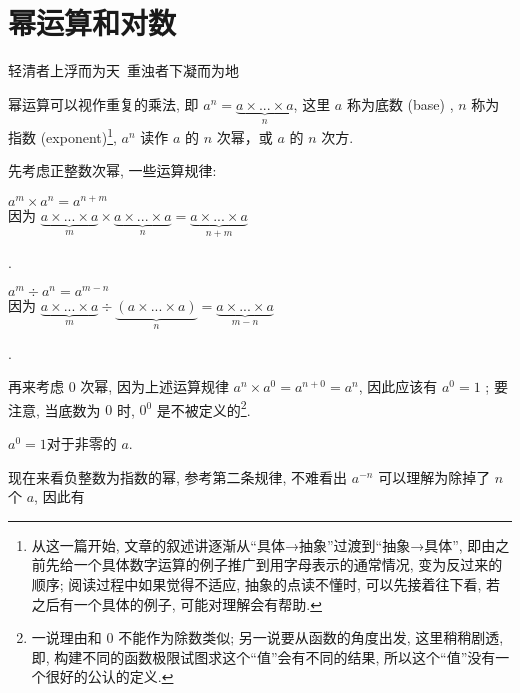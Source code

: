 \section{幂运算和对数}\label{002}

\begin{flushright}{\kaishu 轻清者上浮而为天\ 重浊者下凝而为地}\end{flushright}

\begin{tcolorbox}[size=fbox, breakable, enhanced jigsaw, title={幂运算
(exponentiation)}]

幂运算可以视作重复的乘法, 即
$a^n=\underbrace{a\times ...\times a}_{n}$, 这里 $a$ 称为底数 (base)
, $n$ 称为指数 (exponent)\footnote{从这一篇开始,
  文章的叙述讲逐渐从``具体→抽象''过渡到``抽象→具体'',
  即由之前先给一个具体数字运算的例子推广到用字母表示的通常情况,
  变为反过来的顺序; 阅读过程中如果觉得不适应, 抽象的点读不懂时,
  可以先接着往下看, 若之后有一个具体的例子, 可能对理解会有帮助.},
$a^n$ 读作 $a$ 的 $n$ 次幂，或 $a$ 的 $n$ 次方.

先考虑正整数次幂, 一些运算规律:

\begin{itemize}

{\item
$\boxed{a^m\times a^n=a^{n+m}}$\\
因为 $\underbrace{a\times ...\times a}_{m}\times\underbrace{a\times ...\times a}_{n}=\underbrace{a\times ...\times a}_{n+m}$}.
{\item
$\boxed{a^m\div a^n=a^{m-n}}$\\
因为 $\underbrace{a\times ...\times a}_{m}\div\underbrace{(a\times ...\times a)}_{n}=\underbrace{a\times ...\times a}_{m-n}$}.
\end{itemize}

再来考虑 $0$ 次幂, 因为上述运算规律 $a^n\times a^0=a^{n+0}=a^n$,
因此应该有 $a^0=1$ ; 要注意, 当底数为 $0$ 时, $0^0$
是不被定义的\footnote{一说理由和 $0$ 不能作为除数类似;
  另一说要从函数的角度出发, 这里稍稍剧透, 即,
  构建不同的函数极限试图求这个``值''会有不同的结果,
  所以这个``值''没有一个很好的公认的定义.}.

\begin{itemize}

{\item
  $\boxed{a^0=1}$对于非零的 $a$.}
\end{itemize}

现在来看负整数为指数的幂, 参考第二条规律, 不难看出 $a^{-n}$
可以理解为除掉了 $n$ 个 $a$, 因此有


\end{tcolorbox}
